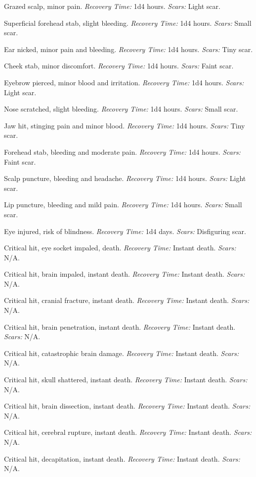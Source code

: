 \begin{description}[labelwidth=1.5em, leftmargin=*, itemsep=0.4em]
    \item[1 -] Grazed scalp, minor pain. \textit{Recovery Time:} 1d4 hours. \textit{Scars:} Light scar.
    \item[2 -] Superficial forehead stab, slight bleeding. \textit{Recovery Time:} 1d4 hours. \textit{Scars:} Small scar.
    \item[3 -] Ear nicked, minor pain and bleeding. \textit{Recovery Time:} 1d4 hours. \textit{Scars:} Tiny scar.
    \item[4 -] Cheek stab, minor discomfort. \textit{Recovery Time:} 1d4 hours. \textit{Scars:} Faint scar.
    \item[5 -] Eyebrow pierced, minor blood and irritation. \textit{Recovery Time:} 1d4 hours. \textit{Scars:} Light scar.
    \item[6 -] Nose scratched, slight bleeding. \textit{Recovery Time:} 1d4 hours. \textit{Scars:} Small scar.
    \item[7 -] Jaw hit, stinging pain and minor blood. \textit{Recovery Time:} 1d4 hours. \textit{Scars:} Tiny scar.
    \item[8 -] Forehead stab, bleeding and moderate pain. \textit{Recovery Time:} 1d4 hours. \textit{Scars:} Faint scar.
    \item[9 -] Scalp puncture, bleeding and headache. \textit{Recovery Time:} 1d4 hours. \textit{Scars:} Light scar.
    \item[10 -] Lip puncture, bleeding and mild pain. \textit{Recovery Time:} 1d4 hours. \textit{Scars:} Small scar.
    \item[11 -] Eye injured, risk of blindness. \textit{Recovery Time:} 1d4 days. \textit{Scars:} Disfiguring scar.
    \item[12 -] Critical hit, eye socket impaled, death. \textit{Recovery Time:} Instant death. \textit{Scars:} N/A.
    \item[13 -] Critical hit, brain impaled, instant death. \textit{Recovery Time:} Instant death. \textit{Scars:} N/A.
    \item[14 -] Critical hit, cranial fracture, instant death. \textit{Recovery Time:} Instant death. \textit{Scars:} N/A.
    \item[15 -] Critical hit, brain penetration, instant death. \textit{Recovery Time:} Instant death. \textit{Scars:} N/A.
    \item[16 -] Critical hit, catastrophic brain damage. \textit{Recovery Time:} Instant death. \textit{Scars:} N/A.
    \item[17 -] Critical hit, skull shattered, instant death. \textit{Recovery Time:} Instant death. \textit{Scars:} N/A.
    \item[18 -] Critical hit, brain dissection, instant death. \textit{Recovery Time:} Instant death. \textit{Scars:} N/A.
    \item[19 -] Critical hit, cerebral rupture, instant death. \textit{Recovery Time:} Instant death. \textit{Scars:} N/A.
    \item[20 -] Critical hit, decapitation, instant death. \textit{Recovery Time:} Instant death. \textit{Scars:} N/A.
\end{description}

